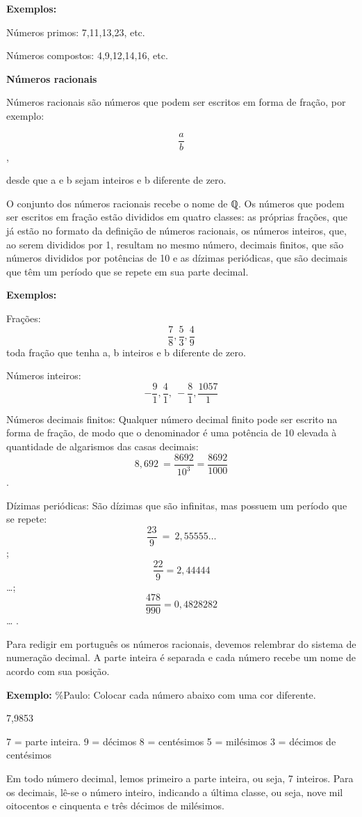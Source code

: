 \textbf{Exemplos:}

Números primos: 7,11,13,23, etc.

Números compostos: 4,9,12,14,16, etc.

\textbf{Números racionais}

Números racionais são números que podem ser escritos em forma de fração,
por exemplo:

\[\frac{a}{b}\],

desde que a e b sejam inteiros e b diferente de zero.

O conjunto dos números racionais recebe o nome de ℚ. Os números que
podem ser escritos em fração estão divididos em quatro classes: as
próprias frações, que já estão no formato da definição de números
racionais, os números inteiros, que, ao serem divididos por 1, resultam
no mesmo número, decimais finitos, que são números divididos por
potências de 10 e as dízimas periódicas, que são decimais que têm um
período que se repete em sua parte decimal.

\textbf{Exemplos:}

Frações:\[\frac{7}{8},\frac{5}{3},\frac{4}{9}\] toda fração que tenha a,
b inteiros e b diferente de zero.

Números inteiros:
\[- \frac{9}{1},\frac{4}{1},\  - \frac{8}{1},\frac{1057}{1}\]

Números decimais finitos: Qualquer número decimal finito pode ser
escrito na forma de fração, de modo que o denominador é uma potência de
10 elevada à quantidade de algarismos das casas decimais:
\[8,692\  = \frac{8692}{10^{3}} = \frac{8692}{1000}\].

Dízimas periódicas: São dízimas que são infinitas, mas possuem um
período que se repete: \[\frac{23}{9}\  = \ 2,55555\ldots\] ;
\[\frac{22}{9} = 2,44444\]\ldots;
\[\frac{478}{990} = 0,4828282\]\ldots{} .

Para redigir em português os números racionais, devemos relembrar do
sistema de numeração decimal. A parte inteira é separada e cada número
recebe um nome de acordo com sua posição.~

\textbf{Exemplo:} \%Paulo: Colocar cada número abaixo com uma cor
diferente.

7,9853

7 = parte inteira. 9 = décimos 8 = centésimos 5 = milésimos 3 = décimos
de centésimos

Em todo número decimal, lemos primeiro a parte inteira, ou seja, 7
inteiros. Para os decimais, lê-se o número inteiro, indicando a última
classe, ou seja, nove mil oitocentos e cinquenta e três décimos de
milésimos.

